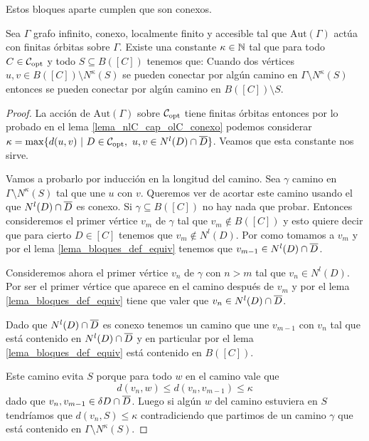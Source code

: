 \documentclass[tesis.tex]{subfiles}
\newcommand{\aut}{\text{Aut}}
\begin{document}
Estos bloques aparte cumplen que son conexos.

\begin{lema}\label{lema_conexion_B(C)}
	Sea $\Gamma$ grafo infinito, conexo, localmente finito y accesible tal que $\aut(\Gamma)$ actúa con finitas órbitas sobre $\Gamma$.
	Existe una constante $\kappa \in \mathbb{N}$ tal que para todo $C \in {\cal C}_{\text{opt}}$ y todo $S \subseteq B([C])$ tenemos que: 
	Cuando dos vértices $u,v \in B([C]) \setminus N^\kappa(S)$ se pueden conectar por algún camino en $\Gamma \setminus N^{\kappa}(S)$ entonces se pueden conectar por algún camino en $B([C]) \setminus S$. 
\end{lema}

\begin{proof}
	La acción de $\aut(\Gamma)$ sobre ${\cal C}_{\text{opt}}$ tiene finitas órbitas entonces por lo probado en el lema \ref{lema_nlC_cap_olC_conexo} podemos considerar 
	$\kappa = \max \{ d(u,v) \ | \ D \in \copt, \  u,v \in N^l(D) \cap \ol D  \}$. 	
	Veamos que esta constante nos sirve.
	
	Vamos a probarlo por inducción en la longitud del camino.
	Sea $\gamma$ camino en $\Gamma \setminus N^{\kappa}(S)$ tal que une $u$ con $v$.
	Queremos ver de acortar este camino usando el  que $N^{l}(D) \cap \overline D$ es conexo.
	Si $\gamma \subseteq B([C])$ no hay nada que probar.
	Entonces consideremos el primer vértice $v_m$ de $\gamma$ tal que $v_m \notin B([C])$ y esto quiere decir que para cierto $D \in [C]$ tenemos que $v_m \notin N^l(D)$.
	Por como tomamos a $v_{m}$ y por el lema \ref{lema_bloques_def_equiv} tenemos que $v_{m-1} \in N^l(D) \cap \overline D$.
	
		
	Consideremos ahora el primer vértice $v_n$ de $\gamma$ con $n > m$ tal que $v_n \in N^l(D)$.
	Por ser el primer vértice que aparece en el camino después de $v_{m}$ y por el lema \ref{lema_bloques_def_equiv} tiene que valer que $v_n \in N^l(D) \cap \overline D$.
	
	Dado que $N^l(D) \cap \overline D$ es conexo tenemos un camino que une $v_{m-1}$ con $v_n$ tal que está contenido en $N^l(D) \cap \overline D$ y en particular por el lema \ref{lema_bloques_def_equiv} está contenido en $B([C])$.
	
	Este camino evita $S$ porque para todo $w$ en el camino vale que 
	\[
		d(v_{n},w) \le d(v_{n},v_{m-1}) \le \kappa
	\]
	dado que $v_{n}, v_{m-1} \in \delta D \cap \overline D$.
	Luego si algún $w$ del camino estuviera en $S$ tendríamos que 
	$d(v_n,S) \le \kappa$ contradiciendo que partimos de un camino $\gamma$ que está contenido en $\Gamma \setminus N^{\kappa}(S)$.	
	
\end{proof}
\end{document}
